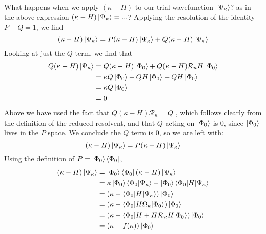 \documentclass{article}
\begin{document}
What happens when we apply $(\kappa - H)$ to our trial wavefunction $\ket{\Psi_{\kappa}}$? 
as in the above expression $(\kappa - H) \ket{\Psi_{\kappa}} = ... $?
Applying the resolution of the identity $P + Q = 1$, we find
\[ (\kappa - H) \ket{\Psi_{\kappa}} =  P (\kappa - H) \ket{\Psi_{\kappa}} + Q (\kappa - H) \ket{\Psi_{\kappa}}  \]
Looking at just the $Q$ term, we find that
\begin{align*}
Q (\kappa - H) \ket{\Psi_{\kappa}} &= Q (\kappa - H) \ket{\Phi_0} + Q (\kappa - H) \mathcal{R}_{\kappa} H \ket{\Phi_0}  \\
&= \kappa Q \ket{\Phi_0} - Q H \ket{\Phi_0} + Q H \ket{\Phi_0}  \\
&= \kappa Q \ket{\Phi_0}  \\
&= 0
\end{align*}
Above we have used the fact that $ Q (\kappa - H) \mathcal{R}_{\kappa}  = Q$ , which follows
clearly from the definition of the reduced resolvent, and that $Q$ acting on $\ket{\Phi_0}$ is 0, since 
$\ket{\Phi_0}$ lives in the $P$ space. 
We conclude the $Q$ term is 0, so we are left with:
\[ (\kappa - H) \ket{\Psi_{\kappa}} =  P (\kappa - H) \ket{\Psi_{\kappa}} \]
Using the definition of $P = \ket{\Phi_0}\bra{\Phi_0}$,
\begin{align*}
 (\kappa - H) \ket{\Psi_{\kappa}} &=  \ket{\Phi_0}\bra{\Phi_0} (\kappa - H) \ket{\Psi_{\kappa}} \\
 &=  \kappa \ket{\Phi_0} \braket{\Phi_0|\Psi_\kappa} - \ket{\Phi_0} \braket{\Phi_0| H | \Psi_\kappa} \\
 &= (\kappa - \braket{\Phi_0 | H | \Psi_\kappa}) \ket{\Phi_0} \\
 &= (\kappa - \braket{\Phi_0 | H \Omega_\kappa | \Phi_0}) \ket{\Phi_0} \\
 &= (\kappa - \braket{\Phi_0 | H + H \mathcal{R}_\kappa H  | \Phi_0} ) \ket{\Phi_0} \\
 &= (\kappa - f(\kappa)) \ket{\Phi_0}
\end{align*}
\end{document}
